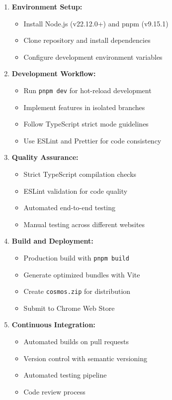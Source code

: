 \documentclass[12pt,a4paper]{article}
\begin{document}
\begin{enumerate}
    \item \textbf{Environment Setup:}
    \begin{itemize}
        \item Install Node.js (v22.12.0+) and pnpm (v9.15.1)
        \item Clone repository and install dependencies
        \item Configure development environment variables
    \end{itemize}
    
    \item \textbf{Development Workflow:}
    \begin{itemize}
        \item Run \texttt{pnpm dev} for hot-reload development
        \item Implement features in isolated branches
        \item Follow TypeScript strict mode guidelines
        \item Use ESLint and Prettier for code consistency
    \end{itemize}
    
    \item \textbf{Quality Assurance:}
    \begin{itemize}
        \item Strict TypeScript compilation checks
        \item ESLint validation for code quality
        \item Automated end-to-end testing
        \item Manual testing across different websites
    \end{itemize}
    
    \item \textbf{Build and Deployment:}
    \begin{itemize}
        \item Production build with \texttt{pnpm build}
        \item Generate optimized bundles with Vite
        \item Create \texttt{cosmos.zip} for distribution
        \item Submit to Chrome Web Store
    \end{itemize}
    
    \item \textbf{Continuous Integration:}
    \begin{itemize}
        \item Automated builds on pull requests
        \item Version control with semantic versioning
        \item Automated testing pipeline
        \item Code review process
    \end{itemize}
\end{enumerate}
\newpage
\end{document}
